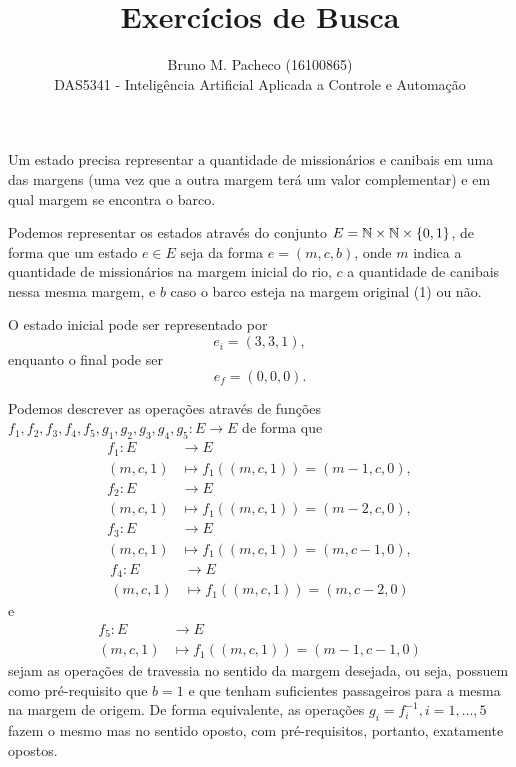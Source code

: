 \documentclass[a4paper]{report}
\begin{document}
 
\title{Exercícios de Busca}
\author{Bruno M. Pacheco (16100865)\\
DAS5341 - Inteligência Artificial Aplicada a Controle e Automação}
 
\maketitle
 


Um estado precisa representar a quantidade de missionários e canibais em uma das margens (uma vez que a outra margem terá um valor complementar) e em qual margem se encontra o barco.

Podemos representar os estados através do conjunto $E = \mathbb{N}\times \mathbb{N}\times \{0,1\} $, de forma que um estado $e\in E$ seja da forma $e = \left( m, c, b \right) $, onde $m$ indica a quantidade de missionários na margem inicial do rio, $c$ a quantidade de canibais nessa mesma margem, e $b$ caso o barco esteja na margem original (1) ou não.


O estado inicial pode ser representado por \[
e_i = \left( 3,3,1 \right) 
,\] enquanto o final pode ser \[
e_f = \left( 0,0,0 \right) 
.\] 


Podemos descrever as operações através de funções $f_1,f_2,f_3,f_4,f_5,g_1,g_2,g_3,g_4,g_5: E \longrightarrow E$ de forma que 
\begin{align*}
    f_1: E &\longrightarrow E \\
    \left( m,c,1 \right)  &\longmapsto f_1(\left( m,c,1 \right) ) = \left( m-1,c,0 \right) 
,\end{align*}
\begin{align*}
    f_2: E &\longrightarrow E \\
    \left( m,c,1 \right)  &\longmapsto f_1(\left( m,c,1 \right) ) = \left( m-2,c,0 \right) 
,\end{align*}
\begin{align*}
    f_3: E &\longrightarrow E \\
    \left( m,c,1 \right)  &\longmapsto f_1(\left( m,c,1 \right) ) = \left( m,c-1,0 \right) 
,\end{align*}
\begin{align*}
    f_4: E &\longrightarrow E \\
    \left( m,c,1 \right)  &\longmapsto f_1(\left( m,c,1 \right) ) = \left( m,c-2,0 \right) 
\end{align*}
e
\begin{align*}
    f_5: E &\longrightarrow E \\
    \left( m,c,1 \right)  &\longmapsto f_1(\left( m,c,1 \right) ) = \left( m-1,c-1,0 \right) 
\end{align*}
sejam as operações de travessia no sentido da margem desejada, ou seja, possuem como pré-requisito que $b=1$ e que tenham suficientes passageiros para a mesma na margem de origem. De forma equivalente, as operações $g_i=f_i^{-1}, i=1,\ldots,5$ fazem o mesmo mas no sentido oposto, com pré-requisitos, portanto, exatamente opostos.
\end{document}
